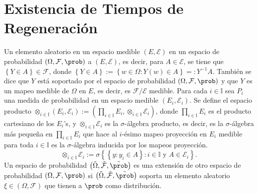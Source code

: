 %
\section{Existencia de Tiempos de Regeneraci\'on}
%


Un elemento aleatorio en un espacio medible $\left(E,\mathcal{E}\right)$ en un espacio de probabilidad $\left(\Omega,\mathcal{F},\prob\right)$ a $\left(E,\mathcal{E}\right)$, es decir,
para $A\in \mathcal{E}$,  se tiene que $\left\{Y\in A\right\}\in\mathcal{F}$, donde $\left\{Y\in A\right\}:=\left\{w\in\Omega:Y\left(w\right)\in A\right\}=:Y^{-1}A$. Tambi\'en se dice que $Y$ est\'a soportado por el espacio de probabilidad $\left(\Omega,\mathcal{F},\prob\right)$ y que $Y$ es un mapeo medible de $\Omega$ en $E$, es decir, es $\mathcal{F}/\mathcal{E}$ medible. Para cada $i\in \mathbb{I}$ sea $P_{i}$ una medida de probabilidad en un espacio medible $\left(E_{i},\mathcal{E}_{i}\right)$. Se define el espacio producto $\otimes_{i\in\mathbb{I}}\left(E_{i},\mathcal{E}_{i}\right):=\left(\prod_{i\in\mathbb{I}}E_{i},\otimes_{i\in\mathbb{I}}\mathcal{E}_{i}\right)$, donde $\prod_{i\in\mathbb{I}}E_{i}$ es el producto cartesiano de los $E_{i}$'s, y $\otimes_{i\in\mathbb{I}}\mathcal{E}_{i}$ es la $\sigma$-\'algebra producto, es decir, es la $\sigma$-\'algebra m\'as peque\~na en $\prod_{i\in\mathbb{I}}E_{i}$ que hace al $i$-\'esimo mapeo proyecci\'on en $E_{i}$ medible para toda $i\in\mathbb{I}$ es la $\sigma$-\'algebra inducida por los mapeos proyecci\'on. $$\otimes_{i\in\mathbb{I}}\mathcal{E}_{i}:=\sigma\left\{\left\{y:y_{i}\in A\right\}:i\in\mathbb{I}\textrm{ y }A\in\mathcal{E}_{i}\right\}.$$ Un espacio de probabilidad $\left(\tilde{\Omega},\tilde{\mathcal{F}},\tilde{\prob}\right)$ es una extensi\'on de otro espacio de probabilidad $\left(\Omega,\mathcal{F},\prob\right)$ si $\left(\tilde{\Omega},\tilde{\mathcal{F}},\tilde{\prob}\right)$ soporta un elemento aleatorio $\xi\in\left(\Omega,\mathcal{F}\right)$ que tienen a $\prob$ como distribuci\'on.

